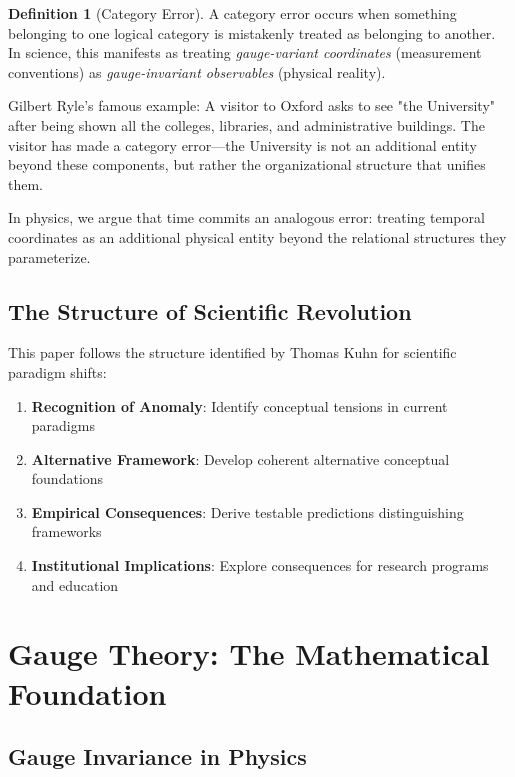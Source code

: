 \documentclass[11pt]{article}
\theoremstyle{definition}
\newtheorem{definition}{Definition}[section]
\theoremstyle{plain}
\theoremstyle{remark}
\begin{document}
\begin{definition}[Category Error]
A category error occurs when something belonging to one logical category is mistakenly treated as belonging to another. In science, this manifests as treating \emph{gauge-variant coordinates} (measurement conventions) as \emph{gauge-invariant observables} (physical reality).
\end{definition}

\begin{analogy}
Gilbert Ryle's famous example: A visitor to Oxford asks to see "the University" after being shown all the colleges, libraries, and administrative buildings. The visitor has made a category error—the University is not an additional entity beyond these components, but rather the organizational structure that unifies them.
\end{analogy}

In physics, we argue that time commits an analogous error: treating temporal coordinates as an additional physical entity beyond the relational structures they parameterize.

\subsection{The Structure of Scientific Revolution}

This paper follows the structure identified by Thomas Kuhn for scientific paradigm shifts:

\begin{enumerate}
\item \textbf{Recognition of Anomaly}: Identify conceptual tensions in current paradigms
\item \textbf{Alternative Framework}: Develop coherent alternative conceptual foundations  
\item \textbf{Empirical Consequences}: Derive testable predictions distinguishing frameworks
\item \textbf{Institutional Implications}: Explore consequences for research programs and education
\end{enumerate}

\section{Gauge Theory: The Mathematical Foundation}

\subsection{Gauge Invariance in Physics}
\end{document}
